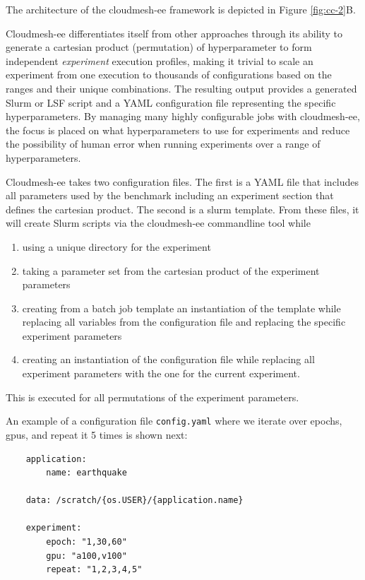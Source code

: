 \documentclass[utf8]{FrontiersinVancouver} %
\begin{document}
The architecture of the cloudmesh-ee framework is depicted in Figure \ref{fig:cc-2}B.

Cloudmesh-ee differentiates itself from other approaches through its ability to generate a cartesian product (permutation) of hyperparameter to form independent {\it experiment} execution profiles, making it trivial to scale an experiment from one execution to thousands of configurations based on the ranges and their unique combinations.  The resulting output provides a generated Slurm or LSF script and a YAML configuration file representing the specific hyperparameters.  By managing many highly configurable jobs with cloudmesh-ee, the focus is placed on what hyperparameters to use for experiments and reduce the possibility of human error when running experiments over a range of hyperparameters.

Cloudmesh-ee takes two configuration files. The first is a YAML file that includes all parameters used by the benchmark including an experiment section that defines the cartesian product. The second is a slurm template. From these files, it will create Slurm scripts via the cloudmesh-ee commandline tool while

\begin{enumerate}
  \item using a unique directory for the experiment
  \item taking a parameter set from the cartesian product of the experiment parameters
  \item creating from a batch job template an instantiation of the template while replacing all variables from the configuration file    and replacing the specific experiment parameters
  \item creating an instantiation of the configuration file while replacing all experiment parameters with the one for the current experiment.
\end{enumerate}

This is executed for all permutations of the experiment parameters.

An example of a configuration file \verb|config.yaml| where we iterate over epochs, gpus, and repeat it 5 times is shown next:

\begin{lstlisting}
    application:
        name: earthquake

    data: /scratch/{os.USER}/{application.name}
       
    experiment:
        epoch: "1,30,60"
        gpu: "a100,v100"
        repeat: "1,2,3,4,5"
\end{lstlisting}
\end{document}
